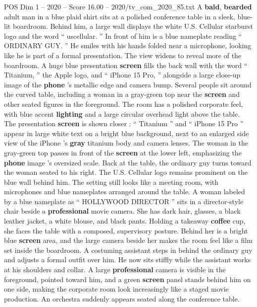 \begin{textsample}{POS Dim 1 – 2020 – Score 16.00 – 2020/tv\_com\_2020\_85.txt}  \label{ex:f1_pos_010}
A \textbf{bald}, \textbf{bearded} adult man in a blue plaid shirt sits at a polished conference table in a sleek, blue-lit boardroom.
Behind him, a large wall displays the white U.S.
Cellular starburst logo and the word “ uscellular. ” In front of him is a blue nameplate reading “ ORDINARY GUY. ” He smiles with his hands folded near a microphone, looking like he is part of a formal presentation.
The view widens to reveal more of the boardroom.
A huge blue presentation \textbf{screen} fills the back wall with the word “ Titanium, ” the Apple logo, and “ iPhone 15 Pro, ” alongside a large close-up image of the \textbf{phone} ’s metallic edge and camera bump.
Several people sit around the curved table, including a woman in a gray-green top near the \textbf{screen} and other seated figures in the foreground.
The room has a polished corporate feel, with blue accent \textbf{lighting} and a large circular overhead light above the table.
The presentation \textbf{screen} is shown closer : “ Titanium ” and “ iPhone 15 Pro ” appear in large white text on a bright blue background, next to an enlarged side view of the iPhone ’s \textbf{gray} titanium body and camera lenses.
The woman in the gray-green top passes in front of the \textbf{screen} at the lower left, emphasizing the \textbf{phone} image ’s oversized scale.
Back at the table, the ordinary guy turns toward the woman seated to his right.
The U.S.
Cellular logo remains prominent on the blue wall behind him.
The setting still looks like a meeting room, with microphones and blue nameplates arranged around the table.
A woman labeled by a blue nameplate as “ HOLLYWOOD DIRECTOR ” sits in a director-style chair beside a \textbf{professional} movie camera.
She has dark hair, glasses, a black leather jacket, a white blouse, and black pants.
Holding a takeaway \textbf{coffee} cup, she faces the table with a composed, supervisory posture.
Behind her is a bright blue \textbf{screen} area, and the large camera beside her makes the room feel like a film set inside the boardroom.
A costuming assistant steps in behind the ordinary guy and adjusts a formal outfit over him.
He now sits stiffly while the assistant works at his shoulders and collar.
A large \textbf{professional} camera is visible in the foreground, pointed toward him, and a green \textbf{screen} panel stands behind him on one side, making the corporate room look increasingly like a staged movie production.
An orchestra suddenly appears seated along the conference table.

\end{textsample}
